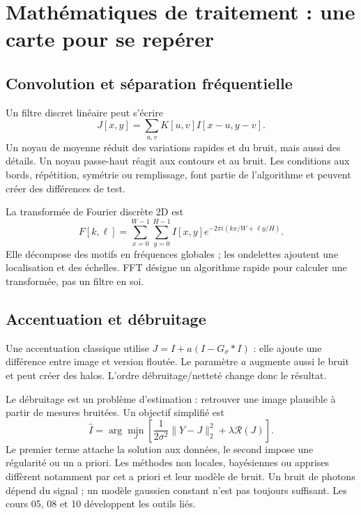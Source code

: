 \section{Mathématiques de traitement : une carte pour se repérer}
\subsection{Convolution et séparation fréquentielle}
Un filtre discret linéaire peut s'écrire
\begin{equation}
J[x,y]=\sum_{u,v}K[u,v]I[x-u,y-v].
\end{equation}
Un noyau de moyenne réduit des variations rapides et
du bruit, mais aussi des détails. Un noyau passe-haut
réagit aux contours et au bruit. Les conditions aux
bords, répétition, symétrie ou remplissage, font partie
de l'algorithme et peuvent créer des différences de test.

La transformée de Fourier discrète 2D est
\begin{equation}
F[k,\ell]=\sum_{x=0}^{W-1}\sum_{y=0}^{H-1}
I[x,y]e^{-2\pi i(kx/W+\ell y/H)}.
\end{equation}
Elle décompose des motifs en fréquences globales ;
les ondelettes ajoutent une localisation et des
échelles. FFT désigne un algorithme rapide pour
calculer une transformée, pas un filtre en soi.

\subsection{Accentuation et débruitage}
Une accentuation classique utilise
$J=I+a(I-G_\sigma*I)$ : elle ajoute une différence
entre image et version floutée. Le paramètre $a$
augmente aussi le bruit et peut créer des halos.
L'ordre débruitage/netteté change donc le résultat.

Le débruitage est un problème d'estimation : retrouver
une image plausible à partir de mesures bruitées.
Un objectif simplifié est
\begin{equation}
\widehat I=\arg\min_J\left[
\frac{1}{2\sigma^2}\|Y-J\|_2^2+\lambda\mathcal R(J)\right].
\end{equation}
Le premier terme attache la solution aux données,
le second impose une régularité ou un a priori.
Les méthodes non locales, bayésiennes ou apprises
diffèrent notamment par cet a priori et leur modèle
de bruit. Un bruit de photons dépend du signal ;
un modèle gaussien constant n'est pas toujours suffisant.
Les cours 05, 08 et 10 développent les outils liés.

